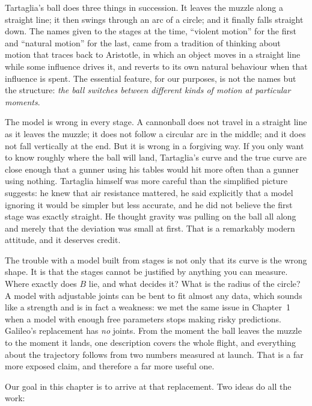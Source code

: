 \documentclass[11pt,twoside,openany]{book}
\begin{document}
Tartaglia's ball does three things in succession. It leaves the muzzle along a straight line; it then swings through an arc of a circle; and it finally falls straight down. The names given to the stages at the time, ``violent motion'' for the first and ``natural motion'' for the last, came from a tradition of thinking about motion that traces back to Aristotle, in which an object moves in a straight line while some influence drives it, and reverts to its own natural behaviour when that influence is spent. The essential feature, for our purposes, is not the names but the structure: \emph{the ball switches between different kinds of motion at particular moments}.

The model is wrong in every stage. A cannonball does not travel in a straight line as it leaves the muzzle; it does not follow a circular arc in the middle; and it does not fall vertically at the end. But it is wrong in a forgiving way. If you only want to know roughly where the ball will land, Tartaglia's curve and the true curve are close enough that a gunner using his tables would hit more often than a gunner using nothing. Tartaglia himself was more careful than the simplified picture suggests: he knew that air resistance mattered, he said explicitly that a model ignoring it would be simpler but less accurate, and he did not believe the first stage was exactly straight. He thought gravity was pulling on the ball all along and merely that the deviation was small at first. That is a remarkably modern attitude, and it deserves credit.

\begin{modelnote}
The trouble with a model built from stages is not only that its curve is the wrong shape. It is that the stages cannot be justified by anything you can measure. Where exactly does $B$ lie, and what decides it? What is the radius of the circle? A model with adjustable joints can be bent to fit almost any data, which sounds like a strength and is in fact a weakness: we met the same issue in Chapter~1 when a model with enough free parameters stops making risky predictions. Galileo's replacement has \emph{no} joints. From the moment the ball leaves the muzzle to the moment it lands, one description covers the whole flight, and everything about the trajectory follows from two numbers measured at launch. That is a far more exposed claim, and therefore a far more useful one.
\end{modelnote}

Our goal in this chapter is to arrive at that replacement. Two ideas do all the work:
\end{document}
